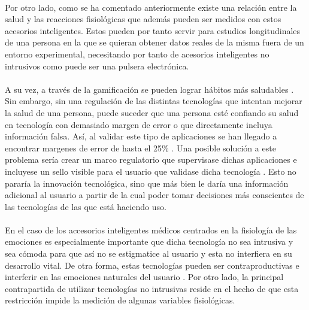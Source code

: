 \paragraph{}
Por otro lado, como se ha comentado anteriormente existe una relación entre la salud y las reacciones fisiológicas que además pueden ser medidos con estos acesorios inteligentes. Estos pueden por tanto servir para estudios longitudinales de una persona en la que se quieran obtener datos reales de la misma fuera de un entorno experimental, necesitando por tanto de acesorios inteligentes no intrusivos \citep{poh2010wearable} como puede ser una pulsera electrónica.

\paragraph{}
A su vez, a través de la gamificación se pueden lograr hábitos más saludables \citep{lister2014just}. Sin embargo, sin una regulación de las distintas tecnologías que intentan mejorar la salud de una persona, puede suceder que una persona esté confiando su salud en tecnología con demasiado margen de error o que directamente incluya información falsa. Así, al validar este tipo de aplicaciones se han llegado a encontrar margenes de error de hasta el 25\% \citep{nam2015validity, case2015accuracy}. Una posible solución a este problema sería crear un marco regulatorio que supervisase dichas aplicaciones e incluyese un sello visible para el usuario que validase dicha tecnología \citep{piwek2016rise}. Esto no pararía la innovación tecnológica, sino que más bien le daría una información adicional al usuario a partir de la cual poder tomar decisiones más conscientes de las tecnologías de las que está haciendo uso.

\paragraph{}
En el caso de los accesorios inteligentes médicos centrados en la fisiología de las emociones es especialmente importante que dicha tecnología no sea intrusiva y sea cómoda para que así no se estigmatice al usuario y esta no interfiera en su desarrollo vital. De otra forma, estas tecnologías pueden ser contraproductivas e interferir en las emociones naturales del usuario \citep{chen2015aiwac}. Por otro lado, la principal contrapartida de utilizar tecnologías no intrusivas reside en el hecho de que esta restricción impide la medición de algunas variables fisiológicas.

